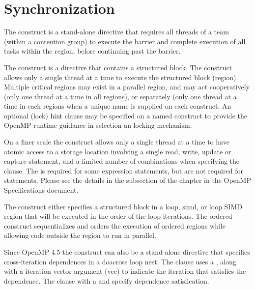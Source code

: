 \pagebreak
\chapter{Synchronization}
\label{chap:synchronization}

The  construct is a stand-alone directive that requires all threads
of a team (within a contention group) to execute the barrier and complete
execution of all tasks within the region, before continuing past the barrier.

The  construct is a directive that contains a structured block. 
The construct allows only a single thread at a time to execute the structured block (region).
Multiple critical regions may exist in a parallel region, and may
act cooperatively (only one thread at a time in all  regions),
or separately (only one thread at a time in each  regions when
a unique name is supplied on each  construct.
An optional (lock) hint clause may be specified on a named  
construct to provide the OpenMP runtime guidance in selection an locking 
mechanism.

On a finer scale the  construct allows only a single thread at 
a time to have atomic access to a storage location involving a single read, 
write, update or capture statement, and a limited number of combinations 
when specifying the   clause.  The 
is required for some expression statements, but are not required for 
 statements. Please see the details in the  
subsection of the  chapter in the OpenMP Specifications document.

The  construct either specifies a structured block in a loop, 
simd, or loop SIMD region that will be executed in the order of the loop 
iterations.  The ordered construct sequentializes and orders the execution 
of ordered regions while allowing code outside the region to run in parallel.

Since OpenMP 4.5 the  construct can also be a stand-alone 
directive that specifies cross-iteration dependences in a doacross loop nest.  
The  clause uses a  , along with a 
iteration vector argument (vec) to indicate the iteration that satisfies the 
dependence.  The  clause with a  and 
 specify dependence satisfication. 


